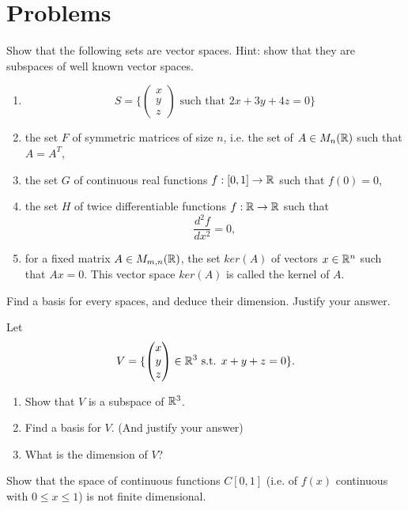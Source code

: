 \section{Problems}

\begin{Pb}
Show that the following sets are vector spaces. Hint: show that they are subspaces of well known vector spaces.
\begin{enumerate}
\item \[S= \{\begin{pmatrix} x \\ y \\ z \end{pmatrix} \text{ such that } 2x+3y+4z = 0\}\]
\item the set $F$ of symmetric matrices of size $n$, i.e. the set of $A\in M_{n}(\mathbb R)$ such that $A = A^T$,
\item the set $G$ of continuous real functions $f: [0,1]\rightarrow \mathbb R$ such that $f(0)=0$,
\item the set $H$ of twice differentiable functions $f: \mathbb R\rightarrow \mathbb R$ such that \[\frac{d^2 f}{dx^2} =0,\]
\item for a fixed matrix $A\in M_{m,n}(\mathbb R)$, the set $ker(A)$ of vectors $x\in \mathbb R^n$ such that $Ax= 0$. This vector space $ker(A)$ is called the kernel of $A$. 
\end{enumerate} 
Find a basis for every spaces, and deduce their dimension. Justify your answer.
\end{Pb}

\begin{Pb}
Let  \[ V = \{ \begin{pmatrix} x \\ y \\ z \end{pmatrix}\in \mathbb R^3 \text{ s.t. } x+y+z =0\}.\]
\begin{enumerate}
\item Show that $V$ is a subspace of $\mathbb R^3$.
\item Find a basis for $V$. (And justify your answer)
\item What is the dimension of $V$?
\end{enumerate}
\end{Pb}

\begin{Pb}
Show that the space of continuous functions $C[0,1]$ (i.e. of $f(x)$ continuous with $0\leq x\leq 1$) is not finite dimensional.
\end{Pb}


